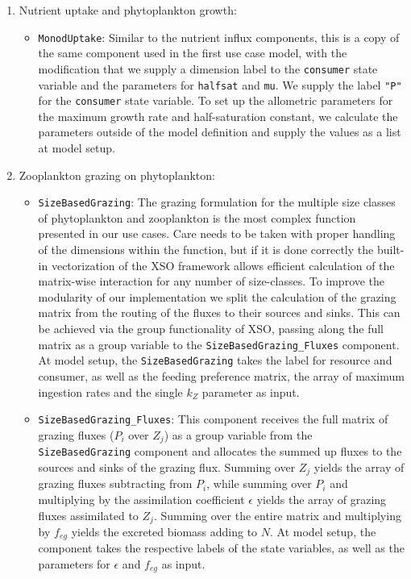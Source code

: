 \documentclass[journal abbreviation, manuscript]{copernicus}
\begin{document}
\begin{enumerate}
    \item Nutrient uptake and phytoplankton growth: 
    \begin{itemize}
        \item \texttt{MonodUptake}: Similar to the nutrient influx components, this is a copy of the same component used in the first use case model, with the modification that we supply a dimension label to the \texttt{consumer} state variable and the parameters for \texttt{halfsat} and \texttt{mu}. We supply the label \texttt{"P"} for the \texttt{consumer} state variable. To set up the allometric parameters for the maximum growth rate and half-saturation constant, we calculate the parameters outside of the model definition and supply the values as a list at model setup.
    \end{itemize}
    
    \item Zooplankton grazing on phytoplankton: 
    \begin{itemize}
        \item \texttt{SizeBasedGrazing}: The grazing formulation for the multiple size classes of phytoplankton and zooplankton is the most complex function presented in our use cases. Care needs to be taken with proper handling of the dimensions within the function, but if it is done correctly the built-in vectorization of the XSO framework allows efficient calculation of the matrix-wise interaction for any number of size-classes. To improve the modularity of our implementation we split the calculation of the grazing matrix from the routing of the fluxes to their sources and sinks. This can be achieved via the group functionality of XSO, passing along the full matrix as a group variable to the \texttt{SizeBasedGrazing\_Fluxes} component. At model setup, the \texttt{SizeBasedGrazing} takes the label for resource and consumer, as well as the feeding preference matrix, the array of maximum ingestion rates and the single $k_Z$ parameter as input.
        \item \texttt{SizeBasedGrazing\_Fluxes}: This component receives the full matrix of grazing fluxes ($P_i$ over $Z_j$) as a group variable from the \texttt{SizeBasedGrazing} component and allocates the summed up fluxes to the sources and sinks of the grazing flux. Summing over $Z_j$ yields the array of grazing fluxes subtracting from $P_i$, while summing over $P_i$ and multiplying by the assimilation coefficient $\epsilon$ yields the array of grazing fluxes assimilated to $Z_j$. Summing over the entire matrix and multiplying by $f_{eg}$ yields the excreted biomass adding to $N$. At model setup, the component takes the respective labels of the state variables, as well as the parameters for $\epsilon$ and $f_{eg}$ as input.
    \end{itemize}
    

\end{enumerate}
\end{document}
